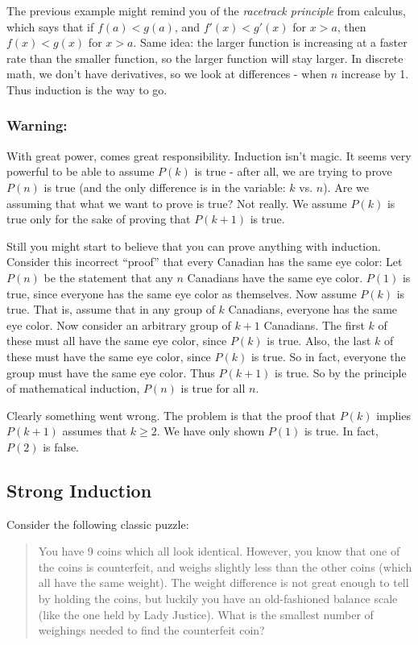 \documentclass[12pt]{article}
\begin{document}
The previous example might remind you of the {\em racetrack principle} from calculus, which says that if $f(a) < g(a)$, and $f'(x) < g'(x)$ for $x > a$, then $f(x) < g(x)$ for $x > a$.  Same idea: the larger function is increasing at a faster rate than the smaller function, so the larger function will stay larger.  In discrete math, we don't have derivatives, so we look at differences - when $n$ increase by 1.  Thus induction is the way to go.

\subsubsection*{Warning:}

With great power, comes great responsibility.  Induction isn't magic.  It seems very powerful to be able to assume $P(k)$ is true - after all, we are trying to prove $P(n)$ is true (and the only difference is in the variable: $k$ vs. $n$).  Are we assuming that what we want to prove is true?  Not really.  We assume $P(k)$ is true only for the sake of proving that $P(k+1)$ is true.  

Still you might start to believe that you can prove anything with induction. Consider this incorrect ``proof'' that every Canadian has the same eye color: Let $P(n)$ be the statement that any $n$ Canadians have the same eye color.  $P(1)$ is true, since everyone has the same eye color as themselves.  Now assume $P(k)$ is true.  That is, assume that in any group of $k$ Canadians, everyone has the same eye color.  Now consider an arbitrary group of $k+1$ Canadians.  The first $k$ of these must all have the same eye color, since $P(k)$ is true.  Also, the last $k$ of these must have the same eye color, since $P(k)$ is true.  So in fact, everyone the group must have the same eye color.  Thus $P(k+1)$ is true.  So by the principle of mathematical induction, $P(n)$ is true for all $n$.

Clearly something went wrong.  The problem is that the proof that $P(k)$ implies $P(k+1)$ assumes that $k \ge 2$.  We have only shown $P(1)$ is true.  In fact, $P(2)$ is false.

\subsection{Strong Induction}

Consider the following classic puzzle:

\begin{quote}
	You have 9 coins which all look identical.  However, you know that one of the coins is counterfeit, and weighs slightly less than the other coins (which all have the same weight).  The weight difference is not great enough to tell by holding the coins, but luckily you have an old-fashioned balance scale (like the one held by Lady Justice).  What is the smallest number of weighings needed to find the counterfeit coin?
\end{quote}
\end{document}
